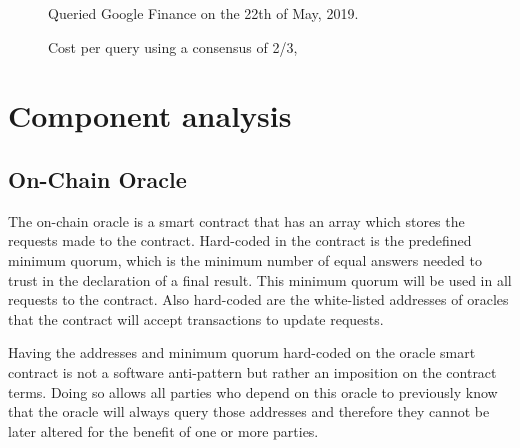 \begin{figure}[H]
    \centering
    \caption{Cost per query using a consensus of 2/3,}{Queried Google Finance on the 22th of May, 2019.}
    \
    \label{oracle-query-cost}
\end{figure}

\section{Component analysis}


\subsection{On-Chain Oracle}

The on-chain oracle is a smart contract that has an array which stores the requests made to the contract. Hard-coded in the contract is the predefined minimum quorum, which is the minimum number of equal answers needed to trust in the declaration of a final result. This minimum quorum will be used in all requests to the contract. Also hard-coded are the white-listed addresses of oracles that the contract will accept transactions to update requests.

Having the addresses and minimum quorum hard-coded on the oracle smart contract is not a software anti-pattern but rather an imposition on the contract terms. Doing so allows all parties who depend on this oracle to previously know that the oracle will always query those addresses and therefore they cannot be later altered for the benefit of one or more parties.

